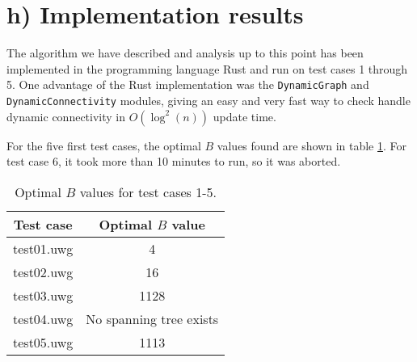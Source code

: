 \section*{h) Implementation results}

The algorithm we have described and analysis up to this point has been implemented in the programming language Rust and run on test cases 1 through 5. One advantage of the Rust implementation was the \texttt{DynamicGraph} and \texttt{DynamicConnectivity} modules, giving an easy and very fast way to check handle dynamic connectivity in $O(\log^2(n))$ update time. 

For the five first test cases, the optimal $B$ values found are shown in table \ref{tab:results}. For test case 6, it took more than 10 minutes to run, so it was aborted. 
\begin{table}[h]
    \centering
    \begin{tabular}{c|c}
        Test case & Optimal $B$ value \\\hline
        test01.uwg & 4 \\
        test02.uwg & 16 \\
        test03.uwg & 1128 \\
        test04.uwg & No spanning tree exists \\
        test05.uwg & 1113
    \end{tabular}
    \caption{Optimal $B$ values for test cases 1-5. }
    \label{tab:results}
\end{table}

